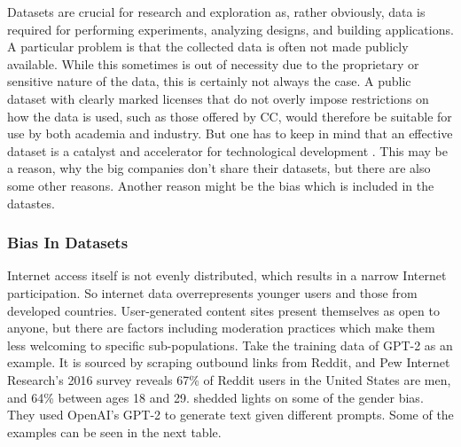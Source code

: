 \documentclass[
]{krantz}
\begin{document}
Datasets are crucial for research and exploration as, rather obviously, data is required for performing experiments, analyzing designs, and building applications. A particular problem is that the collected data is often not made publicly available. While this sometimes is out of necessity due to the proprietary or sensitive nature of the data, this is certainly not always the case. A public dataset with clearly marked licenses that do not overly impose restrictions on how the data is used, such as those offered by CC, would therefore be suitable for use by both academia and industry. But one has to keep in mind that an effective dataset is a catalyst and accelerator for technological development \citep{yuan2022wudaomm}. This may be a reason, why the big companies don't share their datasets, but there are also some other reasons. Another reason might be the bias which is included in the datastes.

\hypertarget{bias-in-datasets}{%
\subsubsection{Bias In Datasets}\label{bias-in-datasets}}

Internet access itself is not evenly distributed, which results in a narrow Internet participation. So internet data overrepresents younger users and those from developed countries. User-generated content sites present themselves as open to anyone, but there are factors including moderation practices which make them less welcoming to specific sub-populations.
Take the training data of GPT-2 as an example. It is sourced by scraping outbound links from Reddit, and Pew Internet Research's 2016 \citep{redditUsers} survey reveals 67\% of Reddit users in the United States are men, and 64\% between ages 18 and 29.
\citet{sheng2019woman} shedded lights on some of the gender bias. They used OpenAI's GPT-2 to generate text given different prompts. Some of the examples can be seen in the next table.
\end{document}
